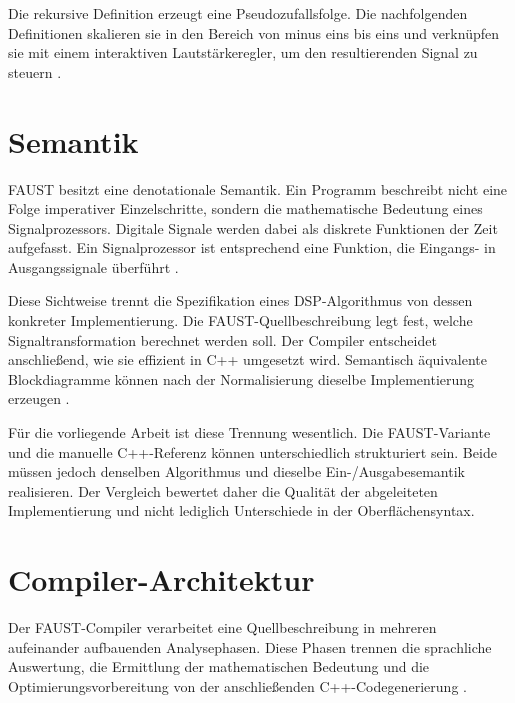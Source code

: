 Die rekursive Definition erzeugt eine Pseudozufallsfolge. Die nachfolgenden Definitionen skalieren sie in den Bereich von minus eins bis eins und verknüpfen sie mit einem interaktiven Lautstärkeregler, um den resultierenden Signal zu steuern \parencite[S.~6]{orlarey:hal-02159014}.

\section{Semantik}
FAUST besitzt eine denotationale Semantik. Ein Programm beschreibt nicht eine Folge imperativer Einzelschritte, sondern die mathematische Bedeutung eines Signalprozessors. Digitale Signale werden dabei als diskrete Funktionen der Zeit aufgefasst. Ein Signalprozessor ist entsprechend eine Funktion, die Eingangs- in Ausgangssignale überführt \parencite[S.~2--4]{orlarey:hal-02159014}.

Diese Sichtweise trennt die Spezifikation eines DSP-Algorithmus von dessen konkreter Implementierung. Die FAUST-Quellbeschreibung legt fest, welche Signaltransformation berechnet werden soll. Der Compiler entscheidet anschließend, wie sie effizient in C++ umgesetzt wird. Semantisch äquivalente Blockdiagramme können nach der Normalisierung dieselbe Implementierung erzeugen \parencite[S.~3, S.~12]{orlarey:hal-02159014}.

Für die vorliegende Arbeit ist diese Trennung wesentlich. Die FAUST-Variante und die manuelle C++-Referenz können unterschiedlich strukturiert sein. Beide müssen jedoch denselben Algorithmus und dieselbe Ein-/Ausgabesemantik realisieren. Der Vergleich bewertet daher die Qualität der abgeleiteten Implementierung und nicht lediglich Unterschiede in der Oberflächensyntax.

\section{Compiler-Architektur}

Der FAUST-Compiler verarbeitet eine Quellbeschreibung in mehreren aufeinander aufbauenden Analysephasen. Diese Phasen trennen die sprachliche Auswertung, die Ermittlung der mathematischen Bedeutung und die Optimierungsvorbereitung von der anschließenden C++-Codegenerierung \parencite[S.~10--13]{orlarey:hal-02159014}.

